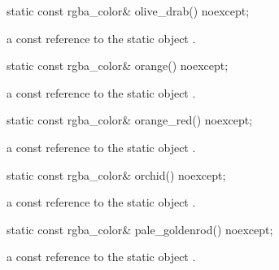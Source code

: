 \begin{itemdecl}
    static const rgba_color& olive_drab() noexcept;
\end{itemdecl}
\begin{itemdescr}
    \pnum
    \returns
    a const reference to the static  object .
\end{itemdescr}

\begin{itemdecl}
    static const rgba_color& orange() noexcept;
\end{itemdecl}
\begin{itemdescr}
    \pnum
    \returns
    a const reference to the static  object .
\end{itemdescr}

\begin{itemdecl}
    static const rgba_color& orange_red() noexcept;
\end{itemdecl}
\begin{itemdescr}
    \pnum
    \returns
    a const reference to the static  object .
\end{itemdescr}

\begin{itemdecl}
    static const rgba_color& orchid() noexcept;
\end{itemdecl}
\begin{itemdescr}
    \pnum
    \returns
    a const reference to the static  object .
\end{itemdescr}

\begin{itemdecl}
    static const rgba_color& pale_goldenrod() noexcept;
\end{itemdecl}
\begin{itemdescr}
    \pnum
    \returns
    a const reference to the static  object .
\end{itemdescr}

